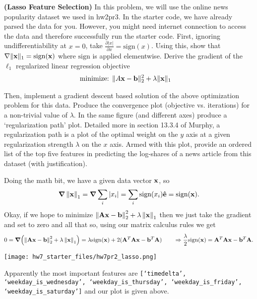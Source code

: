 \documentclass[12pt,letterpaper,fleqn]{hmcpset}
\begin{document}
\begin{problem}[2]
\textbf{(Lasso Feature Selection)} 
In this problem, we will use the online news popularity dataset we used in hw2pr3. In the starter code, we have already parsed the data for you. However, you might need internet connection to access the data and therefore successfully run the starter code.
\newline
\newline
First, ignoring undifferentiability at $x=0$, take $\frac{\partial |x|}{\partial x}
= \mathrm{sign} (x)$. Using this, show that $\nabla \|{\bf x}\|_1 = \mathrm{sign}({\bf x})$ where $\mathrm{sign}$ is applied
elementwise. Derive the gradient of the $\ell_1$ regularized linear regression objective
\begin{align*}
    \text{minimize: } & \|A{\bf x} - {\bf b}\|_2^2 + \lambda \|{\bf x}\|_1
\end{align*}

Then, implement a gradient descent based solution of the above optimization problem for this data. Produce
the convergence plot (objective vs. iterations) for a non-trivial value of $\lambda$.
In the same figure (and different axes) produce a `regularization path' plot. Detailed
more in section 13.3.4 of Murphy, a regularization path is a plot of the optimal weight on
the $y$ axis at a given regularization strength $\lambda$ on the $x$ axis. Armed with this
plot, provide an ordered list of the top five features in predicting the log-shares of a news
article from this dataset (with justification).
\end{problem}
\begin{solution}
Doing the math bit, we have a given data vector $\vb x$, so 
\begin{align*}
\grad \left\lVert\vb x\right\rVert_1 = \grad \sum_i \abs{x_i} = \sum_i {\hbox{sign}}( x_i) \vu e = {\hbox{sign}}(\vb x).
\end{align*}
Okay, if we hope to minimize $\left\lVert\vb A \vb x - \vb b\right\rVert^2_2 + \lambda \left\lVert\vb x\right\rVert_1$ then we just take the gradient and set to zero and all that so, using our matrix calculus rules we get
\begin{align*}
 0 = \grad(\left\lVert\vb A \vb x - \vb b\right\rVert^2_2 + \lambda \left\lVert\vb x\right\rVert_1) = \lambda {\hbox{sign}}(\vb x) + 2(\vb A^T \vb A \vb x - \vb b^T \vb A) \qquad \Rightarrow \frac{\lambda}{2}{\hbox{sign}}(\vb x) = \vb A^T \vb A \vb x - \vb b^T \vb A.
\end{align*}

 \begin{center}
     \texttt{[image: hw7\_starter\_files/hw7pr2\_lasso.png]}
 \end{center}
Apparently the most important features are \texttt{[`timedelta', `weekday\_is\_wednesday', `weekday\_is\_thursday',
 `weekday\_is\_friday', `weekday\_is\_saturday']} and our plot is given above.



\end{solution}
\newpage
\end{document}
